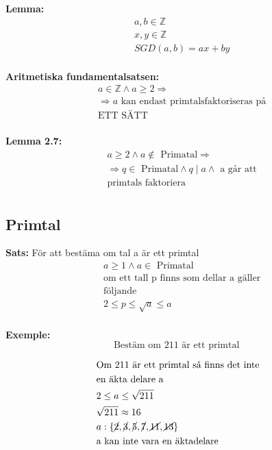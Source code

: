 \begin{multicols}{2}
\textbf{Lemma:}
\begin{align*}
  &a, b \in \mathbb{Z} \\
  &x, y \in \mathbb{Z} \\
  &SGD(a,b) = ax + by  \\
\end{align*}


\textbf{Aritmetiska fundamentalsatsen:}
\begin{align*}
  &a \in \mathbb{Z} \land a \geq 2 \Rightarrow  \\
  &\Rightarrow a \text{ kan endast primtalsfaktoriseras på} \\
  &\text{ETT SÄTT} \\
\end{align*}

\textbf{Lemma 2.7:}
\begin{align*}
  &a \geq 2 \land a \notin \text{ Primatal} \Rightarrow \\
  &\Rightarrow q \in \text{ Primatal} \land q \mid a \land \text{ a går att} \\
  &\text{primtals faktoriera}\\
\end{align*}


\subsection{Primtal}

\textbf{Sats:}
För att bestäma om tal a är ett primtal
\begin{align*}
  &a \geq 1 \land a \in \text{ Primatal} \\
  &\text{om ett tall p finns som dellar a gäller} \\
  &\text{följande} \\
  &2 \leq p \leq \sqrt{a} \leq a \\
\end{align*}


\textbf{Exemple:}
\begin{equation*}
  \text{Bestäm om 211 är ett primtal }
\end{equation*}

\begin{align*}
  &\text{Om 211 är ett primtal så finns det inte} \\
  &\text{en äkta delare a} \\
  &2 \leq a \leq \sqrt{211}  \\
  &\sqrt{211} \approx 16 \\
  &a: \{ \cancel{2}, \cancel{3}, \cancel{5}, \cancel{7}, \cancel{11}, \cancel{13} \} \\
  &\text{a kan inte vara en äktadelare} \\
\end{align*}



\end{multicols}
